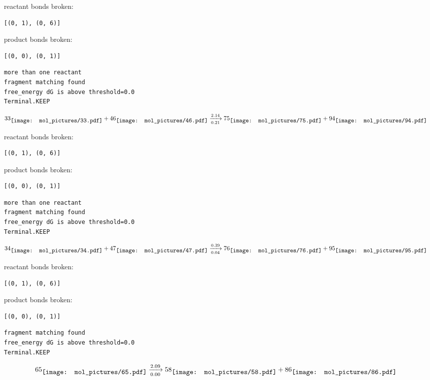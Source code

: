 \documentclass{article}
\begin{document}
reactant bonds broken:\begin{verbatim}
[(0, 1), (0, 6)]
\end{verbatim}
product bonds broken:\begin{verbatim}
[(0, 0), (0, 1)]
\end{verbatim}




\vspace{1cm}
\begin{verbatim}
more than one reactant
fragment matching found
free_energy dG is above threshold=0.0
Terminal.KEEP
\end{verbatim}
$$
33
\raisebox{-.5\height}{\texttt{[image: mol\_pictures/33.pdf]}}
+
46
\raisebox{-.5\height}{\texttt{[image: mol\_pictures/46.pdf]}}
\xrightarrow[0.21]{2.14}
75
\raisebox{-.5\height}{\texttt{[image: mol\_pictures/75.pdf]}}
+
94
\raisebox{-.5\height}{\texttt{[image: mol\_pictures/94.pdf]}}
$$


reactant bonds broken:\begin{verbatim}
[(0, 1), (0, 6)]
\end{verbatim}
product bonds broken:\begin{verbatim}
[(0, 0), (0, 1)]
\end{verbatim}




\vspace{1cm}
\begin{verbatim}
more than one reactant
fragment matching found
free_energy dG is above threshold=0.0
Terminal.KEEP
\end{verbatim}
$$
34
\raisebox{-.5\height}{\texttt{[image: mol\_pictures/34.pdf]}}
+
47
\raisebox{-.5\height}{\texttt{[image: mol\_pictures/47.pdf]}}
\xrightarrow[0.04]{0.39}
76
\raisebox{-.5\height}{\texttt{[image: mol\_pictures/76.pdf]}}
+
95
\raisebox{-.5\height}{\texttt{[image: mol\_pictures/95.pdf]}}
$$


reactant bonds broken:\begin{verbatim}
[(0, 1), (0, 6)]
\end{verbatim}
product bonds broken:\begin{verbatim}
[(0, 0), (0, 1)]
\end{verbatim}




\vspace{1cm}
\begin{verbatim}
fragment matching found
free_energy dG is above threshold=0.0
Terminal.KEEP
\end{verbatim}
$$
65
\raisebox{-.5\height}{\texttt{[image: mol\_pictures/65.pdf]}}
\xrightarrow[0.00]{2.09}
58
\raisebox{-.5\height}{\texttt{[image: mol\_pictures/58.pdf]}}
+
86
\raisebox{-.5\height}{\texttt{[image: mol\_pictures/86.pdf]}}
$$
\end{document}
